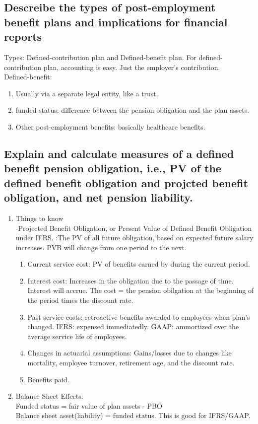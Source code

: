 \documentclass{article}
\newcommand{\be}{\begin{enumerate}}
\newcommand{\ee}{\end{enumerate}}
\begin{document}
\subsection{Descreibe the types of post-employment benefit plans and implications for financial reports}
Types: Defined-contribution plan and Defined-benefit plan. For defined-contribution plan, accounting is easy. Just
the employer's contribution.\\
Defined-benefit:
\be
    \item Usually via a separate legal entity, like a trust.
    \item funded status: difference between the pension obligation and the plan assets.
    \item Other post-employment benefits: basically healthcare benefits.
\ee
\subsection{Explain and calculate measures of a defined benefit pension obligation, i.e., 
PV of the defined benefit obligation and projcted benefit obligation, and net pension liability.}
\be
    \item Things to know
        \\-Projected Benefit Obligation, or Present Value of Defined Benefit Obligation under IFRS.
        :The PV of all future obligation, based on expected future salary increases.
        PVB will change from one period to the next.
        \be
            \item Current service cost: PV of benefits earned by during the current period.
            \item Interest cost: Increases in the obligation due to the passage of time.
                Interest will accrue. The cost = the pension obilgation at the beginning of
                the period times the discount rate.
            \item Past service costs: retroactive benefits awarded to employees when plan's changed.
                IFRS: expensed immediatedly. GAAP: ammortized over the average service life of 
                employees.
            \item Changes in actuarial assumptions: Gains/losses due to changes like mortality, 
                employee turnover, retirement age, and the discount rate.
            \item Benefits paid.
        \ee
    \item Balance Sheet Effects:
        \\Funded status = fair value of plan assets - PBO
        \\ Balance sheet asset(liability) = funded status. This is good for IFRS/GAAP.
\ee
\end{document}
